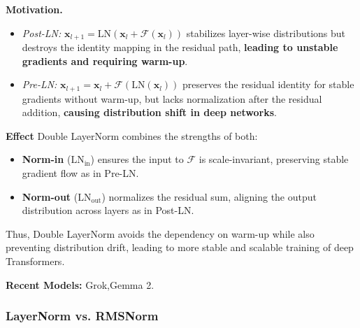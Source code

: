 \textbf{Motivation.}
\begin{itemize}
  \item \emph{Post-LN:} $\mathbf{x}_{l+1} = \text{LN}(\mathbf{x}_l + \mathcal{F}(\mathbf{x}_l))$  
        stabilizes layer-wise distributions but destroys the identity mapping in the residual path, \textbf{leading to unstable gradients and requiring warm-up}.
  \item \emph{Pre-LN:} $\mathbf{x}_{l+1} = \mathbf{x}_l + \mathcal{F}(\text{LN}(\mathbf{x}_l))$  
        preserves the residual identity for stable gradients without warm-up, but lacks normalization after the residual addition, \textbf{causing distribution shift in deep networks}.
\end{itemize}

\textbf{Effect }Double LayerNorm combines the strengths of both: \\ 
\begin{itemize}
  \item \textbf{Norm-in} ($\text{LN}_{\text{in}}$) ensures the input to $\mathcal{F}$ is scale-invariant, preserving stable gradient flow as in Pre-LN.
  \item \textbf{Norm-out} ($\text{LN}_{\text{out}}$) normalizes the residual sum, aligning the output distribution across layers as in Post-LN.
\end{itemize}

Thus, Double LayerNorm avoids the dependency on warm-up while also preventing distribution drift, leading to more stable and scalable training of deep Transformers.

\textbf{Recent Models:} Grok,Gemma 2.



\clearpage
\subsubsection{LayerNorm vs. RMSNorm}


